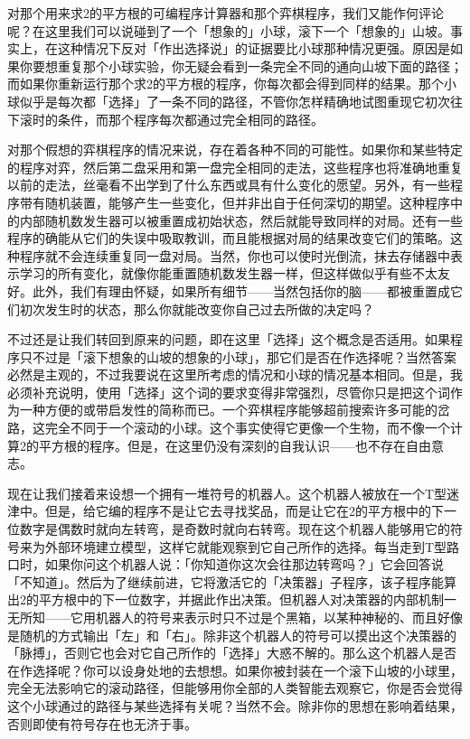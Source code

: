 \documentclass[
  12pt,
  twoside,
  openright,
  oldfontcommands,
]{memoir}
\begin{document}
对那个用来求2的平方根的可编程序计算器和那个弈棋程序，我们又能作何评论呢？在这里我们可以说碰到了一个「想象的」小球，滚下一个「想象的」山坡。事实上，在这种情况下反对「作出选择说」的证据要比小球那种情况更强。原因是如果你要想重复那个小球实验，你无疑会看到一条完全不同的通向山坡下面的路径；而如果你重新运行那个求2的平方根的程序，你每次都会得到同样的结果。那个小球似乎是每次都「选择」了一条不同的路径，不管你怎样精确地试图重现它初次往下滚时的条件，而那个程序每次都通过完全相同的路径。

对那个假想的弈棋程序的情况来说，存在着各种不同的可能性。如果你和某些特定的程序对弈，然后第二盘采用和第一盘完全相同的走法，这些程序也将准确地重复以前的走法，丝毫看不出学到了什么东西或具有什么变化的愿望。另外，有一些程序带有随机装置，能够产生一些变化，但并非出自于任何深切的期望。这种程序中的内部随机数发生器可以被重置成初始状态，然后就能导致同样的对局。还有一些程序的确能从它们的失误中吸取教训，而且能根据对局的结果改变它们的策略。这种程序就不会连续重复同一盘对局。当然，你也可以使时光倒流，抹去存储器中表示学习的所有变化，就像你能重置随机数发生器一样，但这样做似乎有些不太友好。此外，我们有理由怀疑，如果所有细节------当然包括你的脑------都被重置成它们初次发生时的状态，那么你就能改变你自己过去所做的决定吗？

不过还是让我们转回到原来的问题，即在这里「选择」这个概念是否适用。如果程序只不过是「滚下想象的山坡的想象的小球」，那它们是否在作选择呢？当然答案必然是主观的，不过我要说在这里所考虑的情况和小球的情况基本相同。但是，我必须补充说明，使用「选择」这个词的要求变得非常强烈，尽管你只是把这个词作为一种方便的或带启发性的简称而已。一个弈棋程序能够超前搜索许多可能的岔路，这完全不同于一个滚动的小球。这个事实使得它更像一个生物，而不像一个计算2的平方根的程序。但是，在这里仍没有深刻的自我认识------也不存在自由意志。

现在让我们接着来设想一个拥有一堆符号的机器人。这个机器人被放在一个T型迷津中。但是，给它编的程序不是让它去寻找奖品，而是让它在2的平方根中的下一位数字是偶数时就向左转弯，是奇数时就向右转弯。现在这个机器人能够用它的符号来为外部环境建立模型，这样它就能观察到它自己所作的选择。每当走到T型路口时，如果你问这个机器人说：「你知道你这次会往那边转弯吗？」它会回答说「不知道」。然后为了继续前进，它将激活它的「决策器」子程序，该子程序能算出2的平方根中的下一位数字，并据此作出决策。但机器人对决策器的内部机制一无所知------它用机器人的符号来表示时只不过是个黑箱，以某种神秘的、而且好像是随机的方式输出「左」和「右」。除非这个机器人的符号可以摸出这个决策器的「脉搏」，否则它也会对它自己所作的「选择」大惑不解的。那么这个机器人是否在作选择呢？你可以设身处地的去想想。如果你被封装在一个滚下山坡的小球里，完全无法影响它的滚动路径，但能够用你全部的人类智能去观察它，你是否会觉得这个小球通过的路径与某些选择有关呢？当然不会。除非你的思想在影响着结果，否则即使有符号存在也无济于事。
\end{document}
